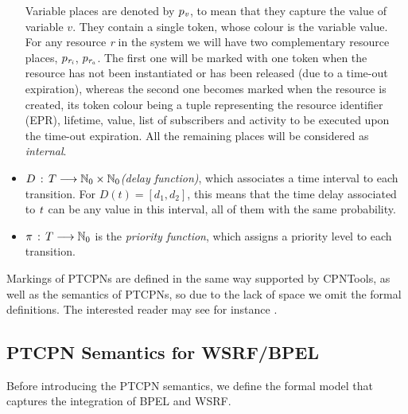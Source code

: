 \begin{definition}
\begin{itemize}
Variable places are denoted by $p_{\it v}$, to mean that they 
capture the value of variable $v$. They contain a single token, whose colour is the variable
value.
% 
For any resource {\it r} in the system we will have two 
complementary resource places, $p_{\it r_i}$, $p_{\it r_a}$.
The first one will be marked with one token when the resource
has not been instantiated or has been released (due to a time-out
expiration), whereas the second one  
becomes marked when the resource is created, its token
colour being a tuple representing the resource identifier (EPR),
lifetime, value, %
list of subscribers and activity to be executed upon
the time-out expiration.
All the remaining places will be considered as {\em internal}.
%
%
%
\item $D\,:\,T \longrightarrow \mathbb{N}_{0} \times \mathbb{N}_{0}${\em (delay function)}, which associates a time
interval to each transition. For $D(t)=[d_1,d_2]$,
this means that the time delay associated to ${\it t}$ can be any value in this interval, all of them with the same probability.
%
\item $\pi\,:\,T \longrightarrow \mathbb{N}_{0}$ is the
{\em priority function}, which assigns a priority level
to each transition.
\end{itemize}
\vspace{-0.5cm}
\end{definition}

Markings of PTCPNs are defined in the same way supported by CPNTools,
as well as the semantics of PTCPNs, so due to the lack of space
we omit the formal definitions. The interested reader may
see for instance \cite{Jensen2009}.%


\subsection{PTCPN Semantics for WSRF/BPEL}

Before introducing the PTCPN semantics, we 
define the formal model that 
captures the integration of BPEL and WSRF.

